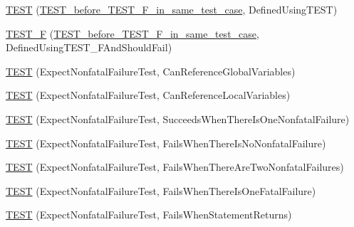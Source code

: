 \begin{DoxyCompactItemize}
\item 
\mbox{\hyperlink{_obj__test_2lib_2googletest-master_2googletest_2test_2googletest-output-test___8cc_a80bcd554d66913b961ad814266a403a8}{T\+E\+ST}} (\mbox{\hyperlink{class_t_e_s_t__before___t_e_s_t___f__in__same__test__case}{T\+E\+S\+T\+\_\+before\+\_\+\+T\+E\+S\+T\+\_\+\+F\+\_\+in\+\_\+same\+\_\+test\+\_\+case}}, Defined\+Using\+T\+E\+ST)
\item 
\mbox{\hyperlink{_obj__test_2lib_2googletest-master_2googletest_2test_2googletest-output-test___8cc_aa0ba9be79b1b05ddadfc8d25c099df31}{T\+E\+S\+T\+\_\+F}} (\mbox{\hyperlink{class_t_e_s_t__before___t_e_s_t___f__in__same__test__case}{T\+E\+S\+T\+\_\+before\+\_\+\+T\+E\+S\+T\+\_\+\+F\+\_\+in\+\_\+same\+\_\+test\+\_\+case}}, Defined\+Using\+T\+E\+S\+T\+\_\+\+F\+And\+Should\+Fail)
\item 
\mbox{\hyperlink{_obj__test_2lib_2googletest-master_2googletest_2test_2googletest-output-test___8cc_a3dd01f9996bd85dd50bd7632f58cbf8c}{T\+E\+ST}} (Expect\+Nonfatal\+Failure\+Test, Can\+Reference\+Global\+Variables)
\item 
\mbox{\hyperlink{_obj__test_2lib_2googletest-master_2googletest_2test_2googletest-output-test___8cc_afe7af77e310ee1a7599e2bc1f0f14354}{T\+E\+ST}} (Expect\+Nonfatal\+Failure\+Test, Can\+Reference\+Local\+Variables)
\item 
\mbox{\hyperlink{_obj__test_2lib_2googletest-master_2googletest_2test_2googletest-output-test___8cc_ac144593aa4a95ae47c0bb03def354f66}{T\+E\+ST}} (Expect\+Nonfatal\+Failure\+Test, Succeeds\+When\+There\+Is\+One\+Nonfatal\+Failure)
\item 
\mbox{\hyperlink{_obj__test_2lib_2googletest-master_2googletest_2test_2googletest-output-test___8cc_a3984cefae98995e99cc3de7251998c34}{T\+E\+ST}} (Expect\+Nonfatal\+Failure\+Test, Fails\+When\+There\+Is\+No\+Nonfatal\+Failure)
\item 
\mbox{\hyperlink{_obj__test_2lib_2googletest-master_2googletest_2test_2googletest-output-test___8cc_a17f835822727dac7b75b74ed70d2fbd2}{T\+E\+ST}} (Expect\+Nonfatal\+Failure\+Test, Fails\+When\+There\+Are\+Two\+Nonfatal\+Failures)
\item 
\mbox{\hyperlink{_obj__test_2lib_2googletest-master_2googletest_2test_2googletest-output-test___8cc_ab9c67cf52ef031fdf619d61283da1ca7}{T\+E\+ST}} (Expect\+Nonfatal\+Failure\+Test, Fails\+When\+There\+Is\+One\+Fatal\+Failure)
\item 
\mbox{\hyperlink{_obj__test_2lib_2googletest-master_2googletest_2test_2googletest-output-test___8cc_aa5976cbca1620f7fea18689a3cbf5333}{T\+E\+ST}} (Expect\+Nonfatal\+Failure\+Test, Fails\+When\+Statement\+Returns)

\end{DoxyCompactItemize}
